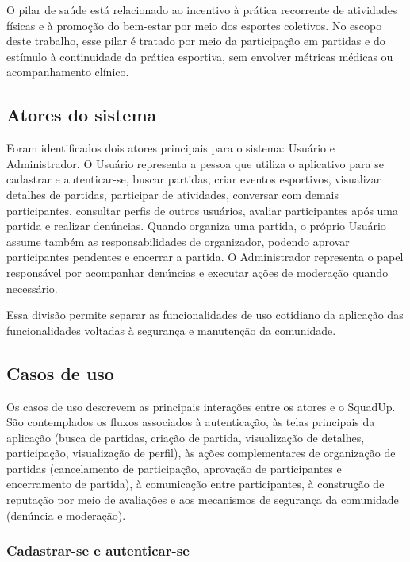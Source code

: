 \documentclass[a4paper, 12pt]{article}
\begin{document}
\begin{justify}
O pilar de saúde está relacionado ao incentivo à prática recorrente de atividades físicas e à promoção do bem-estar por meio dos esportes coletivos. No escopo deste trabalho, esse pilar é tratado por meio da participação em partidas e do estímulo à continuidade da prática esportiva, sem envolver métricas médicas ou acompanhamento clínico.

\subsection{Atores do sistema}

Foram identificados dois atores principais para o sistema: Usuário e Administrador. O Usuário representa a pessoa que utiliza o aplicativo para se cadastrar e autenticar-se, buscar partidas, criar eventos esportivos, visualizar detalhes de partidas, participar de atividades, conversar com demais participantes, consultar perfis de outros usuários, avaliar participantes após uma partida e realizar denúncias. Quando organiza uma partida, o próprio Usuário assume também as responsabilidades de organizador, podendo aprovar participantes pendentes e encerrar a partida. O Administrador representa o papel responsável por acompanhar denúncias e executar ações de moderação quando necessário.

Essa divisão permite separar as funcionalidades de uso cotidiano da aplicação das funcionalidades voltadas à segurança e manutenção da comunidade.

\subsection{Casos de uso}

Os casos de uso descrevem as principais interações entre os atores e o SquadUp. São contemplados os fluxos associados à autenticação, às telas principais da aplicação (busca de partidas, criação de partida, visualização de detalhes, participação, visualização de perfil), às ações complementares de organização de partidas (cancelamento de participação, aprovação de participantes e encerramento de partida), à comunicação entre participantes, à construção de reputação por meio de avaliações e aos mecanismos de segurança da comunidade (denúncia e moderação).

\subsubsection{Cadastrar-se e autenticar-se}


\end{justify}
\end{document}
